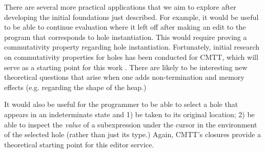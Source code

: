 \documentclass[letterpaper,USenglish]{lipics-v2016}
\begin{document}




There are several more practical applications that we aim to explore after developing the initial foundations just described. For example, it would be useful to be able to continue evaluation where it left off after making an edit to the program that corresponds to hole instantiation. This would require proving a commutativity property regarding hole instantiation. Fortunately, initial research on commutativity properties for holes has been conducted for CMTT, which will serve as a starting point for this work \cite{Nanevski2008}. There are likely to be interesting new theoretical questions that arise when one adds non-termination and memory effects (e.g. regarding the shape of the heap.)

It would also be useful for the programmer to be able to select a hole that appears in an indeterminate state and 1) be taken to its original location; 2) be able to inspect the \emph{value} of a subexpression under the cursor in the environment of the selected hole (rather than just its type.) Again, CMTT's closures provide a theoretical starting point for this editor service. 
\end{document}
